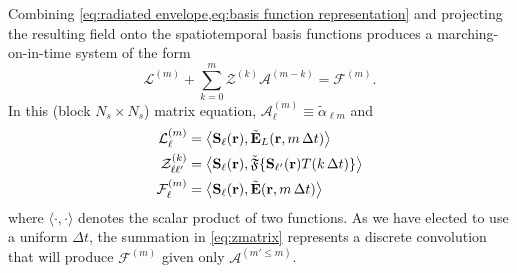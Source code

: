 Combining \cref{eq:radiated envelope,eq:basis function representation} and projecting the resulting field onto the spatiotemporal basis functions produces a marching-on-in-time system of the form
\begin{equation}
  \mathcal{L}^{(m)} + \sum_{k = 0}^{m} \mathcal{Z}^{(k)} \mathcal{A}^{(m - k)} = \mathcal{F}^{(m)}.
  \label{eq:zmatrix}
\end{equation}
In this (block $N_s \times N_s$) matrix equation, $\mathcal{A}^{(m)}_\ell \equiv \tilde{\alpha}_{\ell m}$ and
\begin{subequations}
  \begin{align}
    \mathcal{L}^{(m)}_{\ell} &= \big\langle \mathbf{S}_\ell(\vb{r}), \tilde{\vb{E}}_L(\vb{r}, m \, \Delta t) \big\rangle \\
    \mathcal{Z}^{(k)}_{\ell \ell'} &= \big\langle \mathbf{S}_\ell(\vb{r}), \tilde{\mathfrak{F}}\{ \mathbf{S}_{\ell'}(\mathbf{r}) T(k \, \Delta t) \} \big\rangle \\
    \mathcal{F}^{(m)}_\ell &= \big\langle \mathbf{S}_\ell(\vb{r}), \tilde{\mathbf{E}}(\vb{r}, m \, \Delta t) \big\rangle
  \end{align}
  \label{eq:projections}
\end{subequations}
where $\langle \cdot, \cdot \rangle$ denotes the scalar product of two functions.
As we have elected to use a uniform $\Delta t$, the summation in \cref{eq:zmatrix} represents a discrete convolution that will produce $\mathcal{F}^{(m)}$ given only $\mathcal{A}^{(m' \le m)}$.

